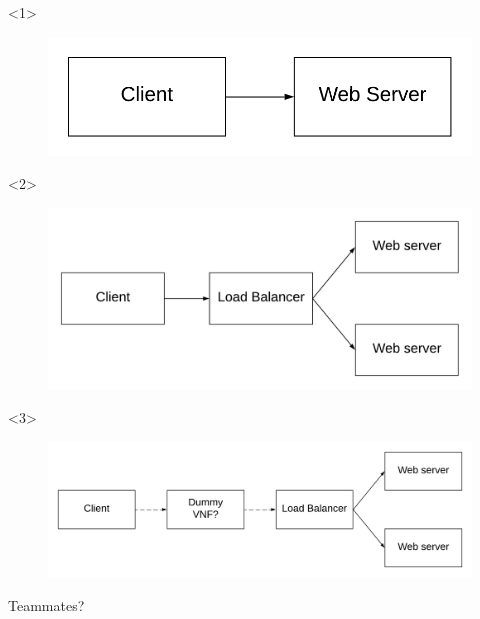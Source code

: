 \documentclass{beamer}
\begin{document}
\begin{frame}
\begin{onlyenv}<1>
	
	\begin{figure}
		\centering
		\includegraphics[width=1\linewidth]{images/1}
		\label{fig:1}
	\end{figure}
	
\end{onlyenv}

\begin{onlyenv}<2>
	
	\begin{figure}
		\centering
		\includegraphics[width=1\linewidth]{images/2}
		\label{fig:2}
	\end{figure}
	
\end{onlyenv}

\begin{onlyenv}<3>
	
	\begin{figure}
		\centering
		\includegraphics[width=1\linewidth]{images/3}
		\label{fig:3}
	\end{figure}
	
\end{onlyenv}


\end{frame}



\begin{frame}
\Huge{\centerline{Teammates?}}
\end{frame}

\end{document}
